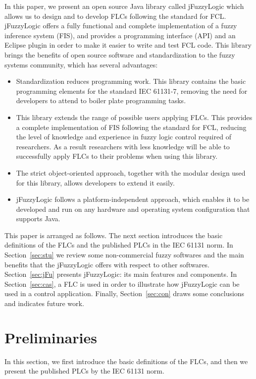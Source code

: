 \documentclass[11pt,twoside]{article}
\begin{document}
\begin{multicols}{2}
In this paper, we present an open source Java library called jFuzzyLogic which allows us to design and to develop FLCs following the standard for FCL. jFuzzyLogic offers a fully functional and complete implementation of a fuzzy inference system (FIS), and provides a programming interface (API) and an Eclipse plugin in order to make it easier to write and test FCL code. This library brings the benefits of open source software and standardization to the fuzzy systems community, which has several advantages:
\begin{itemize}
	\item Standardization reduces programming work. This library contains the basic programming elements for the standard IEC 61131-7, removing the need for developers to attend to boiler plate programming tasks.
	\item This library extends the range of possible users applying FLCs. This provides a complete implementation of FIS following the standard for FCL, reducing the level of knowledge and experience in fuzzy logic control required of researchers. As a result researchers with less knowledge will be able to successfully apply FLCs to their problems when using this library.
	\item The strict object-oriented approach, together with the modular design used for this library, allows developers to extend it easily.
	\item jFuzzyLogic follows a platform-independent approach, which enables it to be developed and run on any hardware and operating system configuration that supports Java.
\end{itemize}

This paper is arranged as follows. The next section introduces the basic definitions of the FLCs and the published PLCs in the IEC 61131 norm. In Section~\ref{sec:stu} we review some non-commercial fuzzy softwares and the main benefits that the jFuzzyLogic offers with respect to other softwares. Section~\ref{sec:jFu} presents jFuzzyLogic: its main features and components. In Section~\ref{sec:cas}, a FLC is used in order to illustrate how jFuzzyLogic can be used in a control application. Finally, Section~\ref{sec:con} draws some conclusions and indicates future work.

\section{Preliminaries}
In this section, we first introduce the basic definitions of the FLCs, and then we present the published PLCs by the IEC 61131 norm.


\end{multicols}
\end{document}
